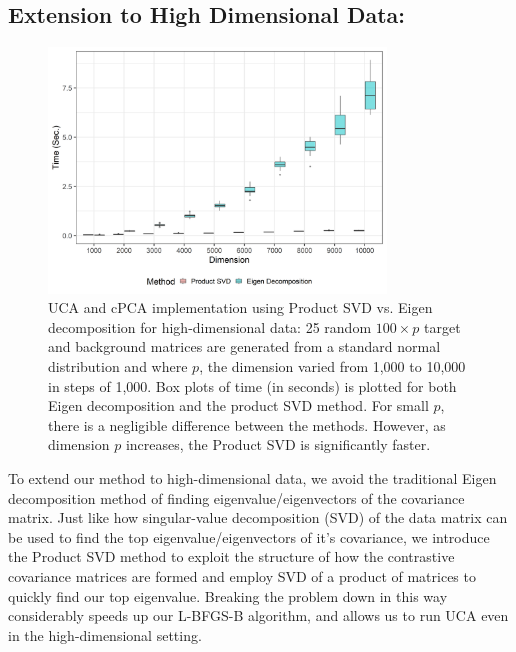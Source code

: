 \documentclass[12pt]{article}
\begin{document}
\subsection{Extension to High Dimensional Data:}
\begin{figure}[!ht]
    \label{fig:computational_perf}
    \centering
	\includegraphics[width = 0.8\textwidth]{figure/final_perf.png}
	\caption{UCA and cPCA implementation using Product SVD vs. Eigen decomposition for high-dimensional data: 25 random $100 \times p $ target and background matrices are generated from a standard normal distribution and where $p$, the dimension varied from 1,000 to 10,000 in steps of 1,000. Box plots of time (in seconds) is plotted for both Eigen decomposition and the product SVD method. For small $p$, there is a negligible difference between the methods. However, as dimension $p$ increases, the Product SVD is significantly faster.}
\end{figure}

To extend our method to high-dimensional data, we avoid the traditional Eigen decomposition method of finding eigenvalue/eigenvectors of the covariance matrix. Just like how singular-value decomposition (SVD) of the data matrix can be used to find the top eigenvalue/eigenvectors of it's covariance, we introduce the Product SVD method to exploit the structure of how the contrastive covariance matrices are formed and employ SVD of a product of matrices to quickly find our top eigenvalue.  Breaking the problem down in this way considerably speeds up our L-BFGS-B algorithm, and allows us to run UCA even in the high-dimensional setting.
\end{document}
